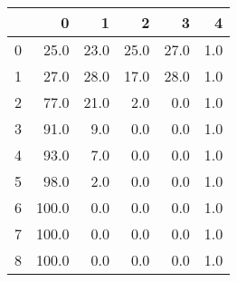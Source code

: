 \begin{tabular}{lrrrrr}
\toprule
{} &      0 &     1 &     2 &     3 &    4 \\
\midrule
0 &   25.0 &  23.0 &  25.0 &  27.0 &  1.0 \\
1 &   27.0 &  28.0 &  17.0 &  28.0 &  1.0 \\
2 &   77.0 &  21.0 &   2.0 &   0.0 &  1.0 \\
3 &   91.0 &   9.0 &   0.0 &   0.0 &  1.0 \\
4 &   93.0 &   7.0 &   0.0 &   0.0 &  1.0 \\
5 &   98.0 &   2.0 &   0.0 &   0.0 &  1.0 \\
6 &  100.0 &   0.0 &   0.0 &   0.0 &  1.0 \\
7 &  100.0 &   0.0 &   0.0 &   0.0 &  1.0 \\
8 &  100.0 &   0.0 &   0.0 &   0.0 &  1.0 \\
\bottomrule
\end{tabular}
